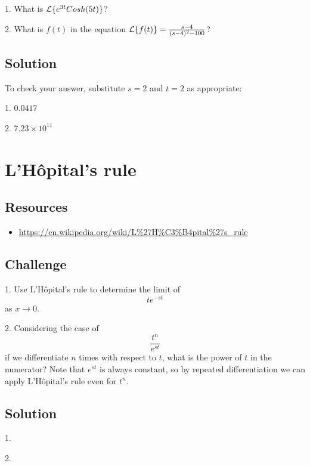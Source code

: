 1. What is $\mathcal{L}\{e^{3t} Cosh(5t)\}$?

2. What is $f(t)$ in the equation $\mathcal{L}\{f(t)\} = \frac{s-4}{(s-4)^2-100}$?

\subsection*{Solution}
To check your answer, substitute $s=2$ and $t=2$ as appropriate:

1. $0.0417$

2. $7.23 \times 10^{11}$




\newpage
\section{L'H\^opital's rule}

\subsection*{Resources}
\begin{itemize}
    \item \url{https://en.wikipedia.org/wiki/L\%27H\%C3\%B4pital\%27s_rule}
\end{itemize}

\subsection*{Challenge}
1. Use L'H\^opital's rule to determine the limit of
\begin{equation}
    t e^{-st}
\end{equation}
as $x \rightarrow 0$.

2. Considering the case of
\begin{equation}
    \frac{t^n}{e^{st}}
\end{equation}
if we differentiate $n$ times with respect to $t$, what is the power of $t$ in the numerator? Note that $e^{st}$ is always constant, so by repeated differentiation we can apply L'H\^opital's rule even for $t^n$.

\subsection*{Solution}
1. 

2. 




\newpage
